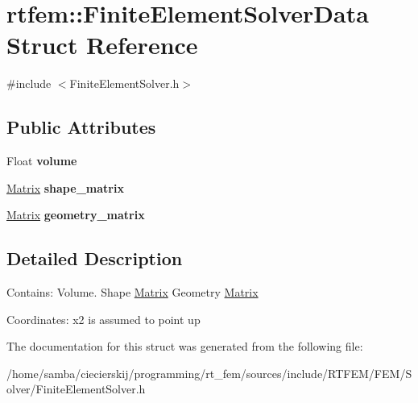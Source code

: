 \hypertarget{structrtfem_1_1FiniteElementSolverData}{}\section{rtfem\+:\+:Finite\+Element\+Solver\+Data Struct Reference}
\label{structrtfem_1_1FiniteElementSolverData}


{\ttfamily \#include $<$Finite\+Element\+Solver.\+h$>$}

\subsection*{Public Attributes}
\begin{DoxyCompactItemize}
\item 
\mbox{\label{structrtfem_1_1FiniteElementSolverData_a4e89fa242b0bcf6709f9ee69856133ff}} 
Float {\bfseries volume}
\item 
\mbox{\label{structrtfem_1_1FiniteElementSolverData_a128d2d84f8115132b9cf28e5543777a4}} 
\hyperlink{classrtfem_1_1Matrix}{Matrix} {\bfseries shape\+\_\+matrix}
\item 
\mbox{\label{structrtfem_1_1FiniteElementSolverData_a0f97fcf6d2d8d61f53c5a73c935e586d}} 
\hyperlink{classrtfem_1_1Matrix}{Matrix} {\bfseries geometry\+\_\+matrix}
\end{DoxyCompactItemize}


\subsection{Detailed Description}
Contains\+: Volume. Shape \hyperlink{classrtfem_1_1Matrix}{Matrix} Geometry \hyperlink{classrtfem_1_1Matrix}{Matrix}

Coordinates\+: x2 is assumed to point \textquotesingle{}up\textquotesingle{} 

The documentation for this struct was generated from the following file\+:\begin{DoxyCompactItemize}
\item 
/home/samba/ciecierskij/programming/rt\+\_\+fem/sources/include/\+R\+T\+F\+E\+M/\+F\+E\+M/\+Solver/Finite\+Element\+Solver.\+h\end{DoxyCompactItemize}
